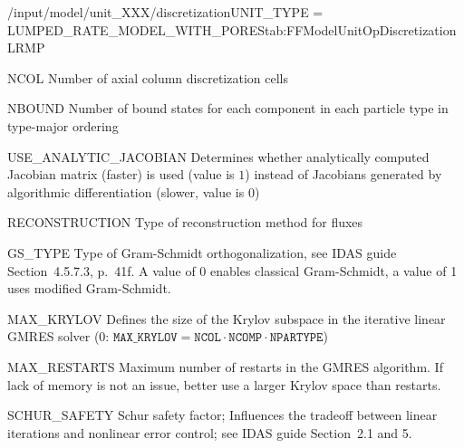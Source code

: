 \begin{condsubgroup}{/input/model/unit\_XXX/discretization}{UNIT\_TYPE = LUMPED\_RATE\_MODEL\_WITH\_PORES}{tab:FFModelUnitOpDiscretizationLRMP}
  \begin{dataset}[type=int,range={$\geq 1$},length=1]{NCOL}
    Number of axial column discretization cells
  \end{dataset}
  \begin{dataset}[type=int,range={$\geq 0$},length={$\texttt{NPARTYPE} \cdot \texttt{NCOMP}$}]{NBOUND}
    Number of bound states for each component in each particle type in type-major ordering
  \end{dataset}
  \begin{dataset}[type=int,range={$\{0, 1\}$},length=1]{USE\_ANALYTIC\_JACOBIAN}
    Determines whether analytically computed Jacobian matrix (faster) is used (value is $1$) instead of Jacobians generated by algorithmic differentiation (slower, value is $0$)
  \end{dataset}
  \begin{dataset}[type=string,range={\texttt{WENO}},length={1}]{RECONSTRUCTION}
    Type of reconstruction method for fluxes
  \end{dataset}
  \begin{dataset}[type=int,range={$\{0, 1\}$},length=1]{GS\_TYPE}
    Type of Gram-Schmidt orthogonalization, see IDAS guide Section~4.5.7.3, p.~41f.
    A value of $0$ enables classical Gram-Schmidt, a value of 1 uses modified Gram-Schmidt.
  \end{dataset}
  \begin{dataset}[type=int,range={$\{0, \dots, \texttt{NCOL} \cdot \texttt{NCOMP} \cdot \texttt{NPARTYPE} \}$},length=1]{MAX\_KRYLOV}
    Defines the size of the Krylov subspace in the iterative linear GMRES solver (0: $\texttt{MAX\_KRYLOV} = \texttt{NCOL} \cdot \texttt{NCOMP} \cdot \texttt{NPARTYPE}$)
  \end{dataset}
  \begin{dataset}[type=int,range={$\geq 0$},length=1]{MAX\_RESTARTS}
    Maximum number of restarts in the GMRES algorithm. If lack of memory is not an issue, better use a larger Krylov space than restarts.
  \end{dataset}
  \begin{dataset}[type=double,range={$\geq 0$},length=1]{SCHUR\_SAFETY}
    Schur safety factor; Influences the tradeoff between linear iterations and nonlinear error control; see IDAS guide Section~2.1 and 5.
  \end{dataset}
\end{condsubgroup}

